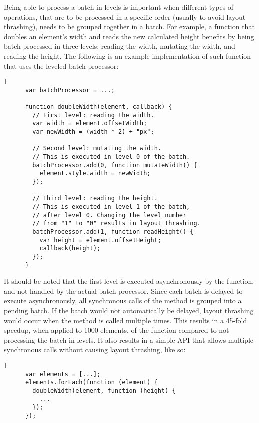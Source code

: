 \documentclass{llncs}
\begin{document}
    Being able to process a batch in levels is important when different types of operations, that are to be processed in a specific order (usually to avoid layout thrashing), needs to be grouped together in a batch.
    For example, a function that doubles an element's width and reads the new calculated height benefits by being batch processed in three levels: reading the width, mutating the width, and reading the height.
    The following is an example implementation of such function that uses the leveled batch processor:

    \begin{lstlisting}[gobble=6,label={},caption={},captionpos=b]]
      var batchProcessor = ...;

      function doubleWidth(element, callback) {
        // First level: reading the width.
        var width = element.offsetWidth;
        var newWidth = (width * 2) + "px";

        // Second level: mutating the width.
        // This is executed in level 0 of the batch.
        batchProcessor.add(0, function mutateWidth() {
          element.style.width = newWidth;
        });

        // Third level: reading the height.
        // This is executed in level 1 of the batch,
        // after level 0. Changing the level number
        // from "1" to "0" results in layout thrashing.
        batchProcessor.add(1, function readHeight() {
          var height = element.offsetHeight;
          callback(height);
        });
      }
    \end{lstlisting}

    \noindent
    It should be noted that the first level is executed asynchronously by the function, and not handled by the actual batch processor.
    Since each batch is delayed to execute asynchronously, all synchronous calls of the method is grouped into a pending batch.
    If the batch would not automatically be delayed, layout thrashing would occur when the method is called multiple times.
    This results in a 45-fold speedup, when applied to 1000 elements, of the function compared to not processing the batch in levels.
    It also results in a simple API that allows multiple synchronous calls without causing layout thrashing, like so:

    \begin{lstlisting}[gobble=6,label={},caption={},captionpos=b]]
      var elements = [...];
      elements.forEach(function (element) {
        doubleWidth(element, function (height) {
          ...
        });
      });
    \end{lstlisting}
\end{document}
